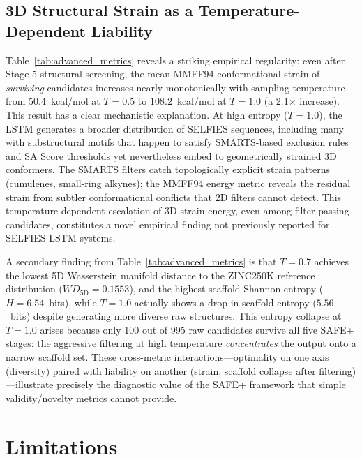 \documentclass[conference]{IEEEtran}
\begin{document}
\subsection{3D Structural Strain as a Temperature-Dependent Liability}

Table~\ref{tab:advanced_metrics} reveals a striking empirical regularity: even after Stage 5 structural screening, the mean MMFF94 conformational strain of \textit{surviving} candidates increases nearly monotonically with sampling temperature---from $50.4$~kcal/mol at $T{=}0.5$ to $108.2$~kcal/mol at $T{=}1.0$ (a 2.1$\times$ increase). This result has a clear mechanistic explanation. At high entropy ($T{=}1.0$), the LSTM generates a broader distribution of SELFIES sequences, including many with substructural motifs that happen to satisfy SMARTS-based exclusion rules and SA Score thresholds yet nevertheless embed to geometrically strained 3D conformers. The SMARTS filters catch topologically explicit strain patterns (cumulenes, small-ring alkynes); the MMFF94 energy metric reveals the residual strain from subtler conformational conflicts that 2D filters cannot detect. This temperature-dependent escalation of 3D strain energy, even among filter-passing candidates, constitutes a novel empirical finding not previously reported for SELFIES-LSTM systems.

A secondary finding from Table~\ref{tab:advanced_metrics} is that $T{=}0.7$ achieves the lowest 5D Wasserstein manifold distance to the ZINC250K reference distribution ($WD_{\text{5D}}{=}0.1553$), and the highest scaffold Shannon entropy ($H{=}6.54$~bits), while $T{=}1.0$ actually shows a drop in scaffold entropy ($5.56$~bits) despite generating more diverse raw structures. This entropy collapse at $T{=}1.0$ arises because only 100 out of 995 raw candidates survive all five SAFE+ stages: the aggressive filtering at high temperature \textit{concentrates} the output onto a narrow scaffold set. These cross-metric interactions---optimality on one axis (diversity) paired with liability on another (strain, scaffold collapse after filtering)---illustrate precisely the diagnostic value of the SAFE+ framework that simple validity/novelty metrics cannot provide.


\section{Limitations}
\end{document}
